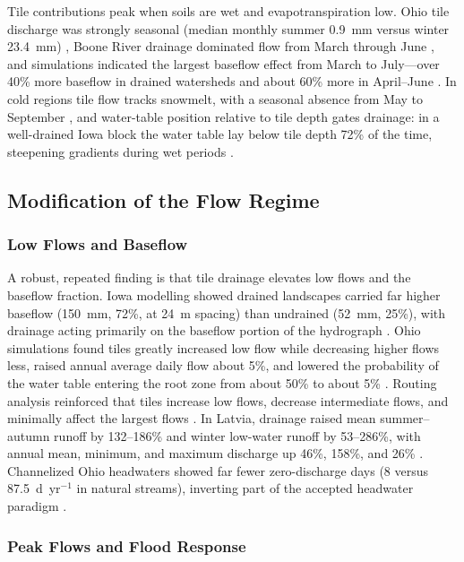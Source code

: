 \documentclass[11pt]{article}
\begin{document}
Tile contributions peak when soils are wet and evapotranspiration low. Ohio tile discharge was strongly seasonal (median monthly summer 0.9~mm versus winter 23.4~mm) \parencite{King2014}, Boone River drainage dominated flow from March through June \parencite{Schilling2019}, and simulations indicated the largest baseflow effect from March to July---over 40\% more baseflow in drained watersheds and about 60\% more in April--June \parencite{Schilling2008}. In cold regions tile flow tracks snowmelt, with a seasonal absence from May to September \parencite{Kompanizare2024}, and water-table position relative to tile depth gates drainage: in a well-drained Iowa block the water table lay below tile depth 72\% of the time, steepening gradients during wet periods \parencite{Logsdon2020}.

\subsection{Modification of the Flow Regime}

\subsubsection{Low Flows and Baseflow}

A robust, repeated finding is that tile drainage elevates low flows and the baseflow fraction. Iowa modelling showed drained landscapes carried far higher baseflow (150~mm, 72\%, at 24~m spacing) than undrained (52~mm, 25\%), with drainage acting primarily on the baseflow portion of the hydrograph \parencite{Schilling2008}. Ohio simulations found tiles greatly increased low flow while decreasing higher flows less, raised annual average daily flow about 5\%, and lowered the probability of the water table entering the root zone from about 50\% to about 5\% \parencite{Rathore2025}. Routing analysis reinforced that tiles increase low flows, decrease intermediate flows, and minimally affect the largest flows \parencite{Sloan2017}. In Latvia, drainage raised mean summer--autumn runoff by 132--186\% and winter low-water runoff by 53--286\%, with annual mean, minimum, and maximum discharge up 46\%, 158\%, and 26\% \parencite{Apsite2017}. Channelized Ohio headwaters showed far fewer zero-discharge days (8 versus 87.5~d~yr$^{-1}$ in natural streams), inverting part of the accepted headwater paradigm \parencite{King2009}.

\subsubsection{Peak Flows and Flood Response}
\end{document}
